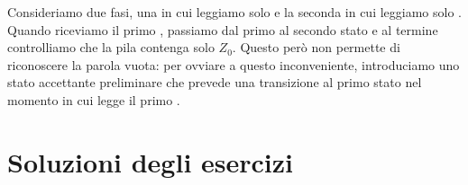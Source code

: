 \begin{Answer}
	Consideriamo due fasi, una in cui leggiamo solo \zero e la seconda in cui leggiamo solo \uno.
	Quando riceviamo il primo \uno, passiamo dal primo al secondo stato e al termine controlliamo che la pila contenga solo $Z_{0}$.
	Questo però non permette di riconoscere la parola vuota: per ovviare a questo inconveniente, introduciamo uno stato
	accettante preliminare che prevede una transizione al primo stato nel momento in cui legge il primo \zero.
\end{Answer}


\newpage
\section{Soluzioni degli esercizi}
\label{sec:soluzioni-cfg}
\shipoutAnswer

